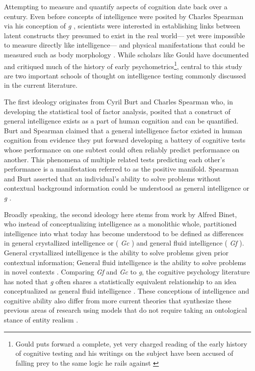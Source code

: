 \documentclass[12pt,]{book}
\let\rmarkdownfootnote\footnote%
\def\footnote{\protect\rmarkdownfootnote}
\begin{document}
Attempting to measure and quantify aspects of cognition date back over a century.
Even before concepts of intelligence were posited by Charles Spearman via his conception of \emph{g} \citep{spearmanGeneralIntelligenceObjectively1904}, scientists were interested in establishing links between latent constructs they presumed to exist in the real world--- yet were impossible to measure directly like intelligence--- and physical manifestations that could be measured such as body morphology \citep{gouldMismeasureMan1996}.
While scholars like Gould have documented and critiqued much of the history of early psychometrics\footnote{Gould puts forward a complete, yet very charged reading of the early history of cognitive testing and his writings on the subject have been accused of falling prey to the same logic he rails against \citep{warneStephenJayGould2019}}, central to this study are two important schools of thought on intelligence testing commonly discussed in the current literature.

The first ideology originates from Cyril Burt and Charles Spearman who, in developing the statistical tool of factor analysis, posited that a construct of general intelligence exists as a part of human cognition and can be quantified.
Burt and Spearman claimed that a general intelligence factor existed in human cognition from evidence they put forward developing a battery of cognitive tests whose performance on one subtest could often reliably predict performance on another.
This phenomena of multiple related tests predicting each other's performance is a manifestation referred to as the positive manifold.
Spearman and Burt asserted that an individual's ability to solve problems without contextual background information could be understood as general intelligence or \emph{g} \citep{spearmanGeneralIntelligenceObjectively1904}.

Broadly speaking, the second ideology here stems from work by Alfred Binet, who instead of conceptualizing intelligence as a monolithic whole, partitioned intelligence into what today has become understood to be defined as differences in general crystallized intelligence or ( \emph{Gc} ) and general fluid intelligence ( \emph{Gf} ).
General crystallized intelligence is the ability to solve problems given prior contextual information;
General fluid intelligence is the ability to solve problems in novel contexts \citep{cattellAbilitiesTheirGrowth1971, jhornTheoryFluidCrystalized1994} .
Comparing \emph{Gf} and \emph{Gc} to \emph{g}, the cognitive psychology literature has noted that \emph{g} often shares a statistically equivalent relationship to an idea conceptualized as general fluid intelligence \citep{matzkeIssuePowerIdentification2010}.
These conceptions of intelligence and cognitive ability also differ from more current theories that synthesize these previous areas of research \citep{kovacsProcessOverlapTheory2016} using models that do not require taking an ontological stance of entity realism \citep{borsboomTheoreticalStatusLatent2003}.
\end{document}
